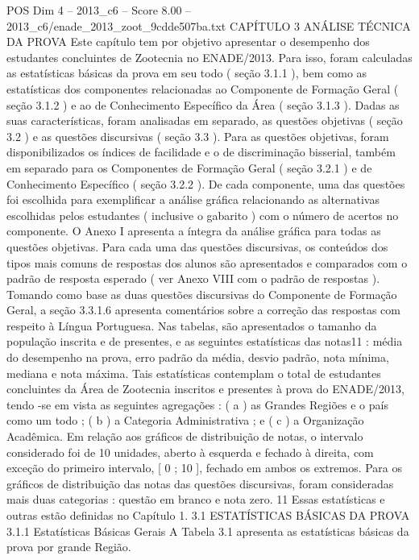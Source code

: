 \begin{textsample}{POS Dim 4 – 2013\_c6 – Score 8.00 – 2013\_c6/enade\_2013\_zoot\_9cdde507ba.txt}  \label{ex:f4_pos_047}
CAPÍTULO 3 ANÁLISE TÉCNICA DA PROVA Este capítulo tem por objetivo apresentar o desempenho dos estudantes concluintes de Zootecnia no ENADE/2013.
Para isso, foram calculadas as estatísticas básicas da prova em seu todo ( seção 3.1.1 ), bem como as estatísticas dos componentes relacionadas ao Componente de Formação Geral ( seção 3.1.2 ) e ao de Conhecimento Específico da Área ( seção 3.1.3 ).
Dadas as suas características, foram analisadas em separado, as questões objetivas ( seção 3.2 ) e as questões discursivas ( seção 3.3 ).
Para as questões objetivas, foram disponibilizados os índices de facilidade e o de discriminação bisserial, também em separado para os Componentes de Formação Geral ( seção 3.2.1 ) e de Conhecimento Específico ( seção 3.2.2 ).
De cada componente, uma das questões foi escolhida para exemplificar a análise gráfica relacionando as alternativas escolhidas pelos estudantes ( inclusive o gabarito ) com o número de acertos no componente.
O Anexo I apresenta a íntegra da análise gráfica para todas as questões objetivas.
Para cada uma das questões discursivas, os conteúdos dos tipos mais comuns de respostas dos alunos são apresentados e comparados com o padrão de resposta esperado ( ver Anexo VIII com o padrão de respostas ).
Tomando como base as duas questões discursivas do Componente de Formação Geral, a seção 3.3.1.6 apresenta comentários sobre a correção das respostas com respeito à Língua Portuguesa.
Nas tabelas, são apresentados o tamanho da população inscrita e de presentes, e as seguintes estatísticas das notas11 : média do desempenho na prova, erro padrão da média, desvio padrão, nota mínima, mediana e nota máxima.
Tais estatísticas contemplam o total de estudantes concluintes da Área de Zootecnia inscritos e presentes à prova do ENADE/2013, tendo -se em vista as seguintes agregações : ( a ) as Grandes Regiões e o país como um todo ; ( b ) a Categoria Administrativa ; e ( c ) a Organização Acadêmica.
Em relação aos gráficos de distribuição de notas, o intervalo considerado foi de 10 unidades, aberto à esquerda e fechado à direita, com exceção do primeiro intervalo, [ 0 ; 10 ], fechado em ambos os extremos.
Para os gráficos de distribuição das notas das questões discursivas, foram consideradas mais duas categorias : questão em branco e nota zero. 11 Essas estatísticas e outras estão definidas no Capítulo 1. 3.1 ESTATÍSTICAS BÁSICAS DA PROVA 3.1.1 Estatísticas Básicas Gerais A Tabela 3.1 apresenta as estatísticas básicas da prova por grande Região.

\end{textsample}
